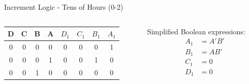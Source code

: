 \documentclass{beamer}
\begin{document}
\begin{frame}{Increment Logic - Tens of Hours (0-2)}
    \begin{columns}
        \begin{column}{0.5\textwidth}
            \begin{table}
                \centering
                \scriptsize
                \begin{tabular}{|c|c|c|c|c|c|c|c|}
                \hline
                D & C & B & A & $D_1$ & $C_1$ & $B_1$ & $A_1$ \\ 
                \hline
                0 & 0 & 0 & 0 & 0 & 0 & 0 & 1 \\
                0 & 0 & 0 & 1 & 0 & 0 & 1 & 0 \\
                0 & 0 & 1 & 0 & 0 & 0 & 0 & 0 \\
                \hline
                \end{tabular}
            \end{table}
        \end{column}
        \begin{column}{0.5\textwidth}
            Simplified Boolean expressions:
            \begin{align*}
                A_1 &= A'B' \\
                B_1 &= AB' \\
                C_1 &= 0 \\
                D_1 &= 0
            \end{align*}
        \end{column}
    \end{columns}
\end{frame}
\end{document}
